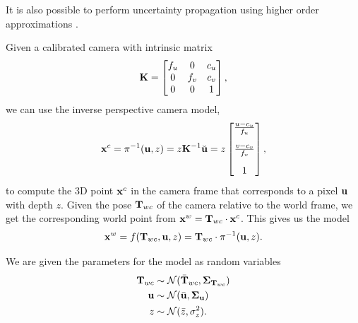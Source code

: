 It is also possible to perform uncertainty propagation using higher order approximations \cite{barfoot2017state}.

\begin{example}[frametitle=Uncertainty in backprojection] \label{ex:uncertainty-backrpojection}
Given a calibrated camera with intrinsic matrix
\begin{equation}
  {\boldsymbol{\mathbf{K}}} =
    \begin{bmatrix}
    f_u & 0 & c_u\\
    0 & f_v & c_v\\
    0 & 0 & 1
  \end{bmatrix},
\end{equation}
we can use the inverse perspective camera model,
\begin{equation}
  {\boldsymbol{\mathbf{x}}}^c = \pi^{-1}({\boldsymbol{\mathbf{u}}}, z) = z {\boldsymbol{\mathbf{K}}}^{-1}
  \breve{{\boldsymbol{\mathbf{u}}}}
  = z
  \begin{bmatrix}
   \frac{u - c_u}{f_u}\\[1em]
   \frac{v - c_v}{f_v}\\[1em]
    1
  \end{bmatrix},
\end{equation}
to compute the 3D point ${\boldsymbol{\mathbf{x}}}^c$ in the camera frame that corresponds to a pixel ${\boldsymbol{\mathbf{u}}}$ with depth $z$.
Given the pose ${\boldsymbol{\mathbf{T}}}_{wc}$ of the camera relative to the world frame, we get the corresponding world point from ${\boldsymbol{\mathbf{x}}}^w = {\boldsymbol{\mathbf{T}}}_{wc} \cdot {\boldsymbol{\mathbf{x}}}^c$.
This gives us the model
\begin{equation}
  {\boldsymbol{\mathbf{x}}}^w = f({\boldsymbol{\mathbf{T}}}_{wc}, {\boldsymbol{\mathbf{u}}}, z) = {\boldsymbol{\mathbf{T}}}_{wc} \cdot \pi^{-1}({\boldsymbol{\mathbf{u}}}, z).
\end{equation}

We are given the parameters for the model as random variables
\begin{align}
  {\boldsymbol{\mathbf{T}}}_{wc} &\sim \mathcal{N}(\bar{{\boldsymbol{\mathbf{T}}}}_{wc}, {\boldsymbol{\mathbf{\Sigma}}}_{{\boldsymbol{\mathbf{T}}}_{wc}})\\
  {\boldsymbol{\mathbf{u}}} &\sim \mathcal{N}(\bar{{\boldsymbol{\mathbf{u}}}}, {\boldsymbol{\mathbf{\Sigma}}}_{{\boldsymbol{\mathbf{u}}}})\\
  z &\sim \mathcal{N}(\bar{z}, \sigma^2_z).
\end{align}


\end{example}
